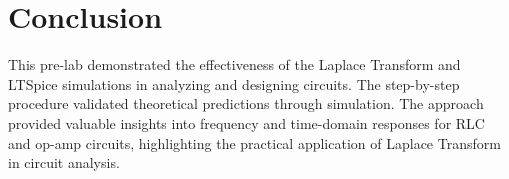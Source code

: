 \chapter{Conclusion}

This pre-lab demonstrated the effectiveness of the Laplace Transform and LTSpice simulations in analyzing and designing circuits. The step-by-step procedure validated theoretical predictions through simulation. The approach provided valuable insights into frequency and time-domain responses for RLC and op-amp circuits, highlighting the practical application of Laplace Transform in circuit analysis.
